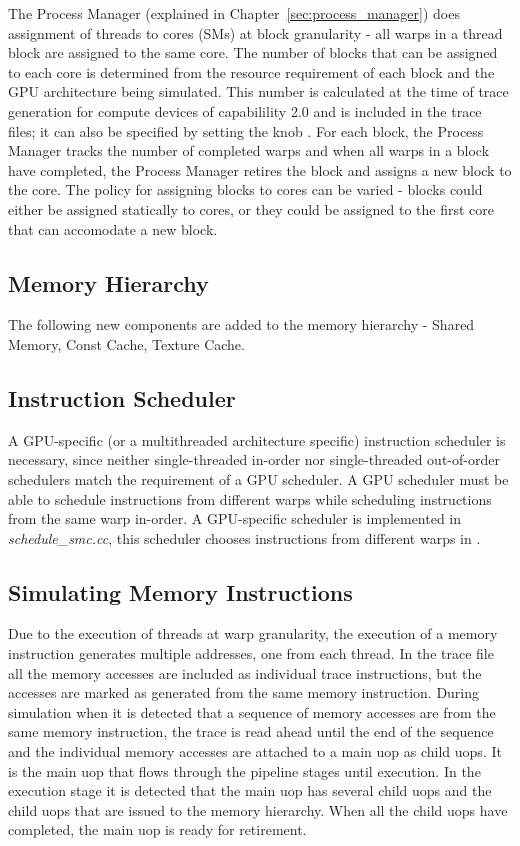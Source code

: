 The Process Manager (explained in Chapter~\ref{sec:process_manager}) does
assignment of threads to cores (SMs) at block granularity - all warps in a
thread block are assigned to the same core. The number of blocks that can be
assigned to each core is determined from the resource requirement of each block
and the GPU architecture being simulated.  This number is calculated at the
time of trace generation for compute devices of capabilility 2.0 and is
included in the trace files; it can also be specified by setting the knob
.  For each
block, the Process Manager tracks the number of completed warps and when all
warps in a block have completed, the Process Manager retires the block and
assigns a new block to the core. The policy for assigning blocks to cores can
be varied - blocks could either be assigned statically to cores, or they could
be assigned to the first core that can accomodate a new block.


\subsection{Memory Hierarchy}

The following new components are added to the memory hierarchy - Shared Memory,
    Const Cache, Texture Cache.

\subsection{Instruction Scheduler}

A GPU-specific (or a multithreaded architecture specific) instruction scheduler
is necessary, since neither single-threaded in-order nor single-threaded
out-of-order schedulers match the requirement of a GPU scheduler. A GPU
scheduler must be able to schedule instructions from different warps while
scheduling instructions from the same warp in-order. A GPU-specific scheduler
is implemented in \textit{schedule\_smc.cc}, this scheduler chooses
instructions from different warps in .

\subsection{Simulating Memory Instructions}

Due to the execution of threads at warp granularity, the execution of a memory
instruction generates multiple addresses, one from each thread. In the trace
file all the memory accesses are included as individual trace instructions, but
the accesses are marked as generated from the same memory instruction. During
simulation when it is detected that a sequence of memory accesses are from the
same memory instruction, the trace is read ahead until the end of the sequence
and the individual memory accesses are attached to a main uop as child uops. It
is the main uop that flows through the pipeline stages until execution. In the
execution stage it is detected that the main uop has several child uops and the
child uops that are issued to the memory hierarchy. When all the child uops
have completed, the main uop is ready for retirement.



